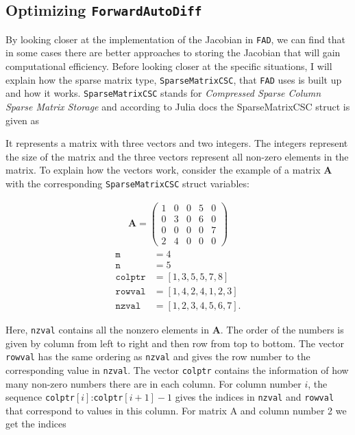 \subsection{Optimizing \texttt{ForwardAutoDiff}}
By looking closer at the implementation of the Jacobian in \texttt{FAD}, we can find that in some cases there are better approaches to storing the Jacobian that will gain computational efficiency. Before looking closer at the specific situations, I will explain how the sparse matrix type, \texttt{SparseMatrixCSC}, that \texttt{FAD} uses is built up and how it works. \texttt{SparseMatrixCSC} stands for \textit{Compressed Sparse Column Sparse Matrix Storage} and according to Julia docs \emph{\citep{SparseMatrixCSC}} the SparseMatrixCSC struct is given as

It represents a matrix with three vectors and two integers. The integers represent the size of the matrix and the three vectors represent all non-zero elements in the matrix. To explain how the vectors work, consider the example of a matrix \textbf{A} with the corresponding \texttt{SparseMatrixCSC} struct variables:
\begin{multicols}{2}
    \begin{align*}
        \textbf{A} = \begin{pmatrix}
        1&0&0&5&0\\
        0&3&0&6&0\\
        0&0&0&0&7\\
        2&4&0&0&0\end{pmatrix}
    \end{align*}
    \columnbreak
    \begin{align*}
        \texttt{m} &= 4\\
        \texttt{n} &= 5\\
        \texttt{colptr} &= [1, 3, 5, 5, 7, 8]\\
        \texttt{rowval} &= [1, 4, 2, 4, 1, 2, 3]\\
        \texttt{nzval} &= [1, 2, 3, 4, 5, 6, 7].
    \end{align*}
\end{multicols}
Here, \texttt{nzval} contains all the nonzero elements in \textbf{A}. The order of the numbers is given by column from left to right and then row from top to bottom. The vector \texttt{rowval} has the same ordering as \texttt{nzval} and gives the row number to the corresponding value in \texttt{nzval}. The vector \texttt{colptr} contains the information of how many non-zero numbers there are in each column. For column number $i$, the sequence \texttt{colptr}$[i]$:\texttt{colptr}$[i+1]-1$ gives the indices in \texttt{nzval} and \texttt{rowval} that correspond to values in this column. For matrix A and column number 2 we get the indices
